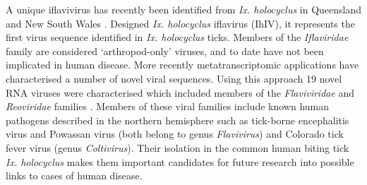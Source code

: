 \documentclass[a4paper, nobind]{templates/ociamthesis}
\begin{document}
A unique iflavivirus has recently been identified from \emph{Ix. holocyclus} in Queensland and New South Wales \autocite{obrienDiscoveryNovelIflavirus2018}.
Designed \emph{Ix. holocyclus} iflavirus (IhIV), it represents the first virus sequence identified in \emph{Ix. holocyclus} ticks.
Members of the \emph{Iflaviridae} family are considered `arthropod-only' viruses, and to date have not been implicated in human disease.
More recently metatranscriptomic applications have characterised a number of novel viral sequences.
Using this approach 19 novel RNA viruses were characterised which included members of the \emph{Flaviviridae} and \emph{Reoviridae} families \autocite{harveyExtensiveDiversityRNA2019}.
Members of these viral families include known human pathogens described in the northern hemisphere such as tick-borne encephalitis virus and Powassan virus (both belong to genus \emph{Flavivirus}) and Colorado tick fever virus (genus \emph{Coltivirus}).
Their isolation in the common human biting tick \emph{Ix. holocyclus} makes them important candidates for future research into possible links to cases of human disease.

\begingroup\fontsize{8}{10}\selectfont
\end{document}
